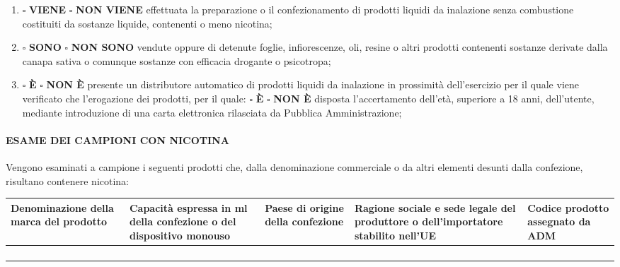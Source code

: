 \documentclass[12pt]{article}
\begin{document}
\begin{enumerate}
    \item \begin{math}\square\end{math} \textbf{VIENE} \begin{math}\square\end{math} \textbf{NON VIENE} effettuata la preparazione o il confezionamento di prodotti liquidi da inalazione senza combustione costituiti da sostanze liquide, contenenti o meno nicotina;
    \item \begin{math}\square\end{math} \textbf{SONO} \begin{math}\square\end{math} \textbf{NON SONO} vendute oppure di detenute foglie, infiorescenze, oli, resine o altri prodotti contenenti sostanze derivate dalla canapa sativa o comunque sostanze con efficacia drogante o psicotropa;
    \item \begin{math}\square\end{math} \textbf{È} \begin{math}\square\end{math} \textbf{NON È} presente un distributore automatico di prodotti liquidi da inalazione in prossimità dell’esercizio per il quale viene verificato che l’erogazione dei prodotti, per il quale: \begin{math}\square\end{math} \textbf{È} \begin{math}\square\end{math} \textbf{NON È} disposta l’accertamento dell’età, superiore a 18 anni, dell’utente, mediante introduzione di una carta elettronica rilasciata da Pubblica Amministrazione;
\end{enumerate}


\newpage
\paragraph{ESAME DEI CAMPIONI CON NICOTINA}

Vengono esaminati a campione i seguenti prodotti che, dalla denominazione commerciale o da altri elementi desunti dalla confezione, risultano contenere nicotina:

\begin{tabularx}{\textwidth}{|Y|Y|Y|Y|Y|}
    \hline
    Denominazione della marca del prodotto & Capacità espressa in ml della confezione o del dispositivo monouso & Paese di origine della confezione & Ragione sociale e sede legale del produttore o dell'importatore stabilito nell'UE & Codice prodotto assegnato da ADM \\
    \hline
     & & & & \\[20pt]
    \hline
     & & & & \\[20pt]
    \hline
     & & & & \\[20pt]
    \hline
     & & & & \\[20pt]
    \hline
\end{tabularx}
\end{document}
